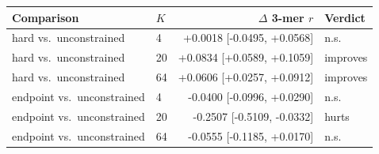 \begin{tabular}{llrl}
\toprule
Comparison & $K$ & $\Delta$ 3-mer $r$ & Verdict \\
\midrule
hard vs.\ unconstrained & 4 & +0.0018 [-0.0495, +0.0568] & n.s. \\
hard vs.\ unconstrained & 20 & +0.0834 [+0.0589, +0.1059] & improves \\
hard vs.\ unconstrained & 64 & +0.0606 [+0.0257, +0.0912] & improves \\
\midrule
endpoint vs.\ unconstrained & 4 & -0.0400 [-0.0996, +0.0290] & n.s. \\
endpoint vs.\ unconstrained & 20 & -0.2507 [-0.5109, -0.0332] & hurts \\
endpoint vs.\ unconstrained & 64 & -0.0555 [-0.1185, +0.0170] & n.s. \\
\bottomrule
\end{tabular}